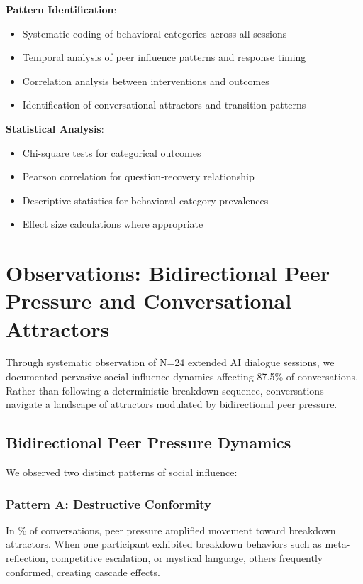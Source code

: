 \documentclass[11pt,letterpaper]{article}
\newcommand{\exponedataTotalSessionsRaw}{24}
\newcommand{\exponedataBreakdownSessionsRaw}{9}
\newcommand{\exponedataTotalSessions}{N=\exponedataTotalSessionsRaw}
\newcommand{\exponedataBreakdownPercentage}{%
  \fpeval{round(\exponedataBreakdownSessionsRaw / \exponedataTotalSessionsRaw * 100, 1)}\%
}
\newcommand{\exponedataPeerPressurePercentage}{87.5\%}
\begin{document}
\textbf{Pattern Identification}:
\begin{itemize}
    \item Systematic coding of behavioral categories across all sessions
    \item Temporal analysis of peer influence patterns and response timing
    \item Correlation analysis between interventions and outcomes
    \item Identification of conversational attractors and transition patterns
\end{itemize}

\textbf{Statistical Analysis}:
\begin{itemize}
    \item Chi-square tests for categorical outcomes
    \item Pearson correlation for question-recovery relationship
    \item Descriptive statistics for behavioral category prevalences
    \item Effect size calculations where appropriate
\end{itemize}

\section{Observations: Bidirectional Peer Pressure and Conversational Attractors}

Through systematic observation of \exponedataTotalSessions{} extended AI dialogue sessions, we documented pervasive social influence dynamics affecting \exponedataPeerPressurePercentage{} of conversations. Rather than following a deterministic breakdown sequence, conversations navigate a landscape of attractors modulated by bidirectional peer pressure.

\subsection{Bidirectional Peer Pressure Dynamics}

We observed two distinct patterns of social influence:

\subsubsection{Pattern A: Destructive Conformity}

In \exponedataBreakdownPercentage{} of conversations, peer pressure amplified movement toward breakdown attractors. When one participant exhibited breakdown behaviors such as meta-reflection, competitive escalation, or mystical language, others frequently conformed, creating cascade effects.
\end{document}
